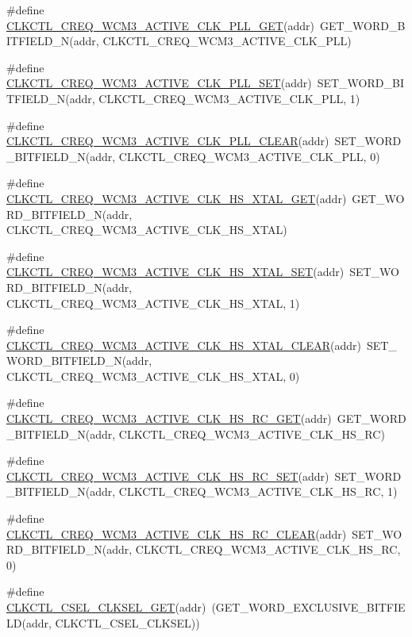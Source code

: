 \begin{DoxyCompactItemize}
\item 
\#define \hyperlink{a00544_ab34dbab060d595d708b3acc6870d36de}{CLKCTL\_\-CREQ\_\-WCM3\_\-ACTIVE\_\-CLK\_\-PLL\_\-GET}(addr)~GET\_\-WORD\_\-BITFIELD\_\-N(addr, CLKCTL\_\-CREQ\_\-WCM3\_\-ACTIVE\_\-CLK\_\-PLL)
\item 
\#define \hyperlink{a00544_a7f3f9a6b9fdc0d4b693a547889207086}{CLKCTL\_\-CREQ\_\-WCM3\_\-ACTIVE\_\-CLK\_\-PLL\_\-SET}(addr)~SET\_\-WORD\_\-BITFIELD\_\-N(addr, CLKCTL\_\-CREQ\_\-WCM3\_\-ACTIVE\_\-CLK\_\-PLL, 1)
\item 
\#define \hyperlink{a00544_a5b3b38b3d8cccd10d1607aff567ef5a3}{CLKCTL\_\-CREQ\_\-WCM3\_\-ACTIVE\_\-CLK\_\-PLL\_\-CLEAR}(addr)~SET\_\-WORD\_\-BITFIELD\_\-N(addr, CLKCTL\_\-CREQ\_\-WCM3\_\-ACTIVE\_\-CLK\_\-PLL, 0)
\item 
\#define \hyperlink{a00544_a8b97da6242cbed3b592989da486a785f}{CLKCTL\_\-CREQ\_\-WCM3\_\-ACTIVE\_\-CLK\_\-HS\_\-XTAL\_\-GET}(addr)~GET\_\-WORD\_\-BITFIELD\_\-N(addr, CLKCTL\_\-CREQ\_\-WCM3\_\-ACTIVE\_\-CLK\_\-HS\_\-XTAL)
\item 
\#define \hyperlink{a00544_a280ec433857aae1bfb30408303b1d605}{CLKCTL\_\-CREQ\_\-WCM3\_\-ACTIVE\_\-CLK\_\-HS\_\-XTAL\_\-SET}(addr)~SET\_\-WORD\_\-BITFIELD\_\-N(addr, CLKCTL\_\-CREQ\_\-WCM3\_\-ACTIVE\_\-CLK\_\-HS\_\-XTAL, 1)
\item 
\#define \hyperlink{a00544_ad6ed29550674d3a3945d542d402af599}{CLKCTL\_\-CREQ\_\-WCM3\_\-ACTIVE\_\-CLK\_\-HS\_\-XTAL\_\-CLEAR}(addr)~SET\_\-WORD\_\-BITFIELD\_\-N(addr, CLKCTL\_\-CREQ\_\-WCM3\_\-ACTIVE\_\-CLK\_\-HS\_\-XTAL, 0)
\item 
\#define \hyperlink{a00544_a7d7f9a97ebcf4cef6b25a08d8c75c686}{CLKCTL\_\-CREQ\_\-WCM3\_\-ACTIVE\_\-CLK\_\-HS\_\-RC\_\-GET}(addr)~GET\_\-WORD\_\-BITFIELD\_\-N(addr, CLKCTL\_\-CREQ\_\-WCM3\_\-ACTIVE\_\-CLK\_\-HS\_\-RC)
\item 
\#define \hyperlink{a00544_a9cce3bf935fa7e19303fc9e943e1d16b}{CLKCTL\_\-CREQ\_\-WCM3\_\-ACTIVE\_\-CLK\_\-HS\_\-RC\_\-SET}(addr)~SET\_\-WORD\_\-BITFIELD\_\-N(addr, CLKCTL\_\-CREQ\_\-WCM3\_\-ACTIVE\_\-CLK\_\-HS\_\-RC, 1)
\item 
\#define \hyperlink{a00544_a5c26faeef3768829e8c4ca9a3cc50247}{CLKCTL\_\-CREQ\_\-WCM3\_\-ACTIVE\_\-CLK\_\-HS\_\-RC\_\-CLEAR}(addr)~SET\_\-WORD\_\-BITFIELD\_\-N(addr, CLKCTL\_\-CREQ\_\-WCM3\_\-ACTIVE\_\-CLK\_\-HS\_\-RC, 0)
\item 
\#define \hyperlink{a00544_a6643c801c8b9c68f8dde1c3e54cb0aa7}{CLKCTL\_\-CSEL\_\-CLKSEL\_\-GET}(addr)~(GET\_\-WORD\_\-EXCLUSIVE\_\-BITFIELD(addr, CLKCTL\_\-CSEL\_\-CLKSEL))
\item 

\end{DoxyCompactItemize}
